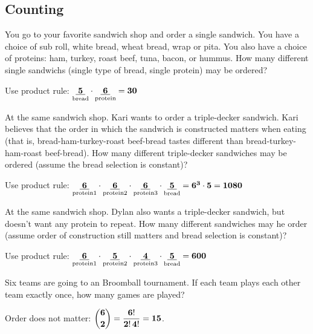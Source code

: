 \begin{questions}
\ifprintanswers
\newpage 
\fi
\section*{Counting}

 You go to your favorite sandwich shop and order a single sandwich.  You have a choice of sub roll, white bread, wheat bread, wrap or pita.  You also have a choice of proteins: ham, turkey, roast beef, tuna, bacon, or hummus.  How many different single sandwichs (single type of bread, single protein) may be ordered?
\ifprintanswers
    \vspace{-10pt}
  \fi
  \begin{solution}
  Use product rule: $\mathbf{ \underset{\text{bread}}{\underline{\;5\;}} \cdot \underset{\text{protein}}{\underline{\;6\;}} = 30} $
  \end{solution}


 At the same sandwich shop.  Kari wants to order a triple-decker sandwich.  Kari believes that the order in which the sandwich is constructed matters when eating (that is, bread-ham-turkey-roast beef-bread tastes different than bread-turkey-ham-roast beef-bread).  How many different triple-decker sandwiches may be ordered (assume the bread selection is constant)?
  \ifprintanswers
    \vspace{-10pt}
  \fi
  \begin{solution}
  Use product rule: $\mathbf{ \underset{\text{protein1}}{\underline{\;6\;}} \cdot 
    \underset{\text{protein2}}{\underline{\;6\;}} \cdot \underset{\text{protein3}}{\underline{\;6\;}} \cdot
    \underset{\text{bread}}{\underline{\;5\;}} = 6^3\cdot5 = 1080} $
  \end{solution}


 At the same sandwich shop. Dylan also wants a triple-decker sandwich, but doesn't want any protein to repeat.  How many different sandwiches may he order (assume order of construction still matters and bread selection is constant)?
  \ifprintanswers
    \vspace{-10pt}
  \fi
  \begin{solution}
  Use product rule: $\mathbf{ \underset{\text{protein1}}{\underline{\;6\;}} \cdot 
    \underset{\text{protein2}}{\underline{\;5\;}} \cdot \underset{\text{protein3}}{\underline{\;4\;}} \cdot
    \underset{\text{bread}}{\underline{\;5\;}} = 600 } $
  \end{solution}


 Six teams are going to an Broomball tournament.  If each team plays each other team exactly once, how many games are played?
  \ifprintanswers
    \vspace{-10pt}
  \fi
  \begin{solution}
  Order does not matter:  $ \displaystyle \mathbf{ \binom{6}{2} = \frac{6!}{2!\,4!} = 15 } $.
  \end{solution}




\end{questions}
